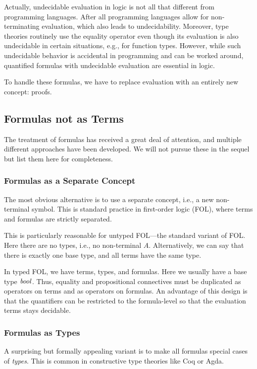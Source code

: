 Actually, undecidable evaluation in logic is not all that different from programming languages.
After all programming languages allow for non-terminating evaluation, which also leads to undecidability.
Moreover, type theories routinely use the equality operator even though its evaluation is also undecidable in certain situations, e.g., for function types.
However, while such undecidable behavior is accidental in programming and can be worked around, quantified formulas with undecidable evaluation are essential in logic.

To handle these formulas, we have to replace evaluation with an entirely new concept: proofs.

\subsection{Formulas not as Terms}

The treatment of formulas has received a great deal of attention, and multiple different approaches have been developed.
We will not pursue these in the sequel but list them here for completeness.

\subsubsection{Formulas as a Separate Concept}

The most obvious alternative is to use a separate concept, i.e., a new non-terminal symbol.
This is standard practice in first-order logic (FOL), where terms and formulas are strictly separated.

This is particularly reasonable for untyped FOL---the standard variant of FOL.
Here there are no types, i.e., no non-terminal $A$.
Alternatively, we can say that there is exactly one base type, and all terms have the same type.

In typed FOL, we have terms, types, and formulas.
Here we usually have a base type $\mathit{bool}$.
Thus, equality and propositional connectives must be duplicated as operators on terms and as operators on formulas.
An advantage of this design is that the quantifiers can be restricted to the formula-level so that the evaluation terms stays decidable.

\subsubsection{Formulas as Types}

A surprising but formally appealing variant is to make all formulas special cases of \emph{types}.
This is common in constructive type theories like Coq or Agda.

